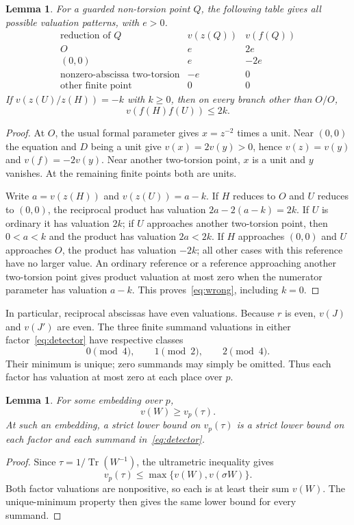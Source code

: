 \documentclass[11pt,a4paper]{article}
\newtheorem{lemma}[theorem]{Lemma}
\DeclareMathOperator{\Tr}{Tr}
\begin{document}
\begin{lemma}\label{lem:table}
For a guarded non-torsion point $Q$, the following table gives all
possible valuation patterns, with $e>0$.
\[
\begin{array}{c|cc}
\text{reduction of }Q&v(z(Q))&v(f(Q))\\ \hline
O&e&2e\\
(0,0)&e&-2e\\
\text{nonzero-abscissa two-torsion}&-e&0\\
\text{other finite point}&0&0
\end{array}
\]
If $v(z(U)/z(H))=-k$ with $k\ge0$, then on every branch other
than $O/O$,
\begin{equation}\label{eq:wrong}
                         v(f(H)f(U))\le2k.
\end{equation}
\end{lemma}
\begin{proof}
At $O$, the usual formal parameter gives $x=z^{-2}$ times a unit.
Near $(0,0)$ the equation and $D$ being a unit give
$v(x)=2v(y)>0$, hence $v(z)=v(y)$ and $v(f)=-2v(y)$.
Near another two-torsion point, $x$ is a unit and $y$ vanishes.
At the remaining finite points both are units.

Write $a=v(z(H))$ and $v(z(U))=a-k$. If $H$ reduces to $O$
and $U$ reduces to $(0,0)$, the reciprocal product has valuation
$2a-2(a-k)=2k$. If $U$ is ordinary it has valuation $2k$;
if $U$ approaches another two-torsion point, then $0<a<k$ and
the product has valuation $2a<2k$.
If $H$ approaches $(0,0)$ and $U$ approaches $O$, the product
has valuation $-2k$; all other cases with this reference have
no larger value. An ordinary reference or a reference approaching
another two-torsion point gives product valuation at most zero
when the numerator parameter has valuation $a-k$.
This proves~\eqref{eq:wrong}, including $k=0$.
\end{proof}

In particular, reciprocal abscissas have even valuations. Because $r$
is even, $v(J)$ and $v(J')$ are even. The three finite summand
valuations in either factor~\eqref{eq:detector} have respective classes
\[
                       0\pmod4,\qquad 1\pmod2,\qquad2\pmod4.
\]
Their minimum is unique; zero summands may simply be omitted.
Thus each factor has valuation at most zero at each place over $p$.

\begin{lemma}\label{lem:trace}
For some embedding over $p$,
\[
                              v(W)\ge v_p(\tau).
\]
At such an embedding, a strict lower bound on $v_p(\tau)$
is a strict lower bound on each factor and each summand
in~\eqref{eq:detector}.
\end{lemma}
\begin{proof}
Since $\tau=1/\Tr(W^{-1})$, the ultrametric inequality gives
\[
 v_p(\tau)\le
       \max\{v(W),v(\sigma W)\}.
\]
Both factor valuations are nonpositive, so each is at least their
sum $v(W)$. The unique-minimum property then gives the same lower
bound for every summand.
\end{proof}
\end{document}
